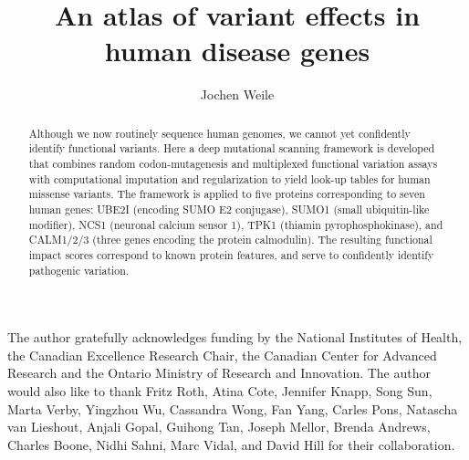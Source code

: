 \documentclass[12pt]{ut-thesis}
\author{Jochen Weile}
\title{An atlas of variant effects in human disease genes}
\begin{document}
\begin{preliminary}

\maketitle


\begin{abstract}

Although we now routinely sequence human genomes, we cannot yet confidently identify functional variants. Here a deep mutational scanning framework is developed that combines random codon-mutagenesis and multiplexed functional variation assays with computational imputation and regularization to yield look-up tables for human missense variants. The framework is applied to five proteins corresponding to seven human genes: UBE2I (encoding SUMO E2 conjugase), SUMO1 (small ubiquitin-like modifier), NCS1 (neuronal calcium sensor 1), TPK1 (thiamin pyrophosphokinase), and CALM1/2/3 (three genes encoding the protein calmodulin). The resulting functional impact scores correspond to known protein features, and serve to confidently identify pathogenic variation. %
\end{abstract}



\begin{acknowledgements}
The author gratefully acknowledges funding by the National Institutes of Health, the Canadian Excellence Research Chair, the Canadian Center for Advanced Research and the Ontario Ministry of Research and Innovation. The author would also like to thank Fritz Roth, Atina Cote, Jennifer Knapp, Song Sun, Marta Verby, Yingzhou Wu, Cassandra Wong, Fan Yang, Carles Pons, Natascha van Lieshout, Anjali Gopal,  Guihong Tan, Joseph Mellor, Brenda Andrews, Charles Boone, Nidhi Sahni, Marc Vidal, and David Hill for their collaboration.
\end{acknowledgements}

\tableofcontents




\end{preliminary}












\end{document}
